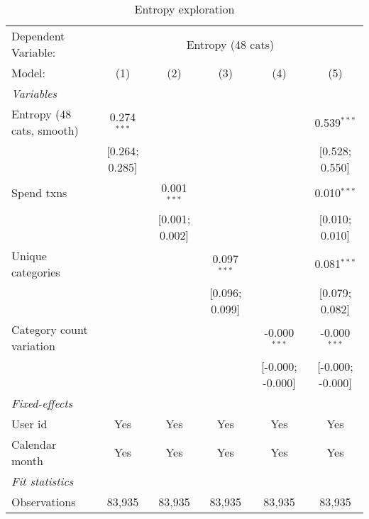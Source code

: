 
\begin{table}[htbp]
   \centering
   \tiny
   \begin{threeparttable}[b]
      \caption{\label{tab:reg_has_sa_inflows_explore} Entropy exploration}
      \begin{tabular}{lccccc}
         \tabularnewline \midrule \midrule
         Dependent Variable: & \multicolumn{5}{c}{Entropy (48 cats)}\\
         Model:                    & (1)            & (2)            & (3)            & (4)              & (5)\\  
         \midrule
         \emph{Variables}\\
         Entropy (48 cats, smooth) & 0.274$^{***}$  &                &                &                  & 0.539$^{***}$\\   
                                   & [0.264; 0.285] &                &                &                  & [0.528; 0.550]\\   
         Spend txns                &                & 0.001$^{***}$  &                &                  & 0.010$^{***}$\\   
                                   &                & [0.001; 0.002] &                &                  & [0.010; 0.010]\\   
         Unique categories         &                &                & 0.097$^{***}$  &                  & 0.081$^{***}$\\   
                                   &                &                & [0.096; 0.099] &                  & [0.079; 0.082]\\   
         Category count variation  &                &                &                & -0.000$^{***}$   & -0.000$^{***}$\\   
                                   &                &                &                & [-0.000; -0.000] & [-0.000; -0.000]\\   
         \midrule
         \emph{Fixed-effects}\\
         User id                   & Yes            & Yes            & Yes            & Yes              & Yes\\  
         Calendar month            & Yes            & Yes            & Yes            & Yes              & Yes\\  
         \midrule
         \emph{Fit statistics}\\
         Observations              & 83,935         & 83,935         & 83,935         & 83,935           & 83,935\\  

\end{tabular}
\end{threeparttable}
\end{table}
